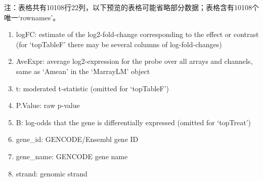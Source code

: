 \documentclass[
]{article}
\providecommand{\tightlist}{%
  \setlength{\itemsep}{0pt}\setlength{\parskip}{0pt}}
\begin{document}
\begin{center}\begin{tcolorbox}[colback=gray!10, colframe=gray!50, width=0.9\linewidth, arc=1mm, boxrule=0.5pt]注：表格共有10108行22列，以下预览的表格可能省略部分数据；表格含有10108个唯一`rownames'。
\end{tcolorbox}
\end{center}
\begin{center}\begin{tcolorbox}[colback=gray!10, colframe=gray!50, width=0.9\linewidth, arc=1mm, boxrule=0.5pt]\begin{enumerate}\tightlist
\item logFC:  estimate of the log2-fold-change corresponding to the effect or contrast (for ‘topTableF’ there may be several columns of log-fold-changes)
\item AveExpr:  average log2-expression for the probe over all arrays and channels, same as ‘Amean’ in the ‘MarrayLM’ object
\item t:  moderated t-statistic (omitted for ‘topTableF’)
\item P.Value:  raw p-value
\item B:  log-odds that the gene is differentially expressed (omitted for ‘topTreat’)
\item gene\_id:  GENCODE/Ensembl gene ID
\item gene\_name:  GENCODE gene name
\item strand:  genomic strand
\end{enumerate}\end{tcolorbox}
\end{center}
\end{document}
